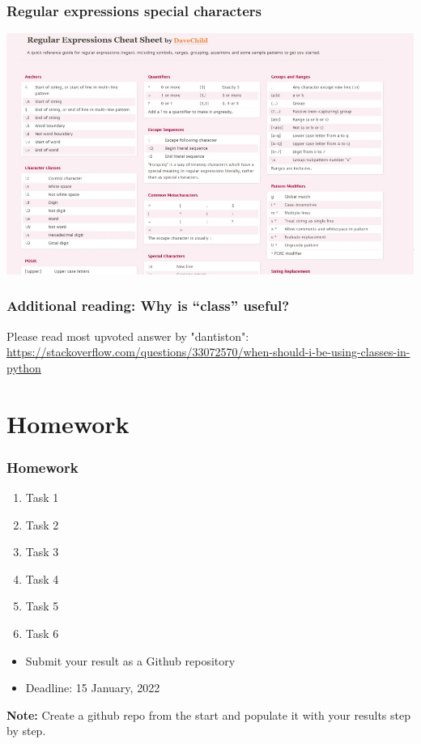 \documentclass{beamer}
\begin{document}
\begin{frame}
    \frametitle{Regular expressions special characters}
            \centering
            \includegraphics[scale=0.5]{figures/regex.jpg}
\end{frame}

\begin{frame}
    \frametitle{Additional reading: Why is “class” useful?}
    Please read most upvoted answer by "dantiston":
     \url{https://stackoverflow.com/questions/33072570/when-should-i-be-using-classes-in-python} 
\end{frame}

\section{Homework} 

\begin{frame}
    \frametitle{Homework}
    \begin{enumerate}
        \item Task 1
        \item Task 2
        \item Task 3
        \item Task 4
        \item Task 5
        \item Task 6
    \end{enumerate}

    \vskip 2mm
    \begin{itemize}
        \item Submit your result as a Github repository
        \item Deadline: 15 January, 2022
    \end{itemize}

\vfill
\textbf{Note:} Create a github repo from the start and populate it with your results step by step.
\end{frame}
\end{document}
